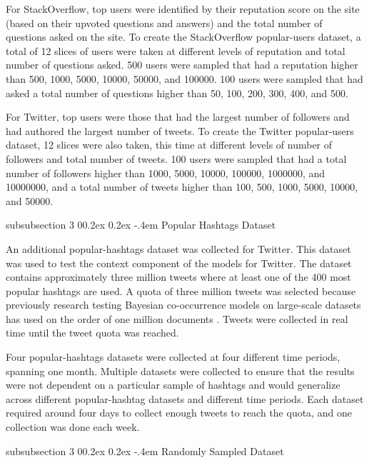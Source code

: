 \documentclass[man,floatsintext,donotrepeattitle]{apa6}
\makeatletter
\renewcommand{\subsubsection}{%
  \@startsection
  {subsubsection}%
  {3}%
  {\parindent}%
  {0\baselineskip \@plus 0.2ex \@minus 0.2ex}%
  {-.4em}%
  {\normalfont\normalsize\bfseries\addperi}}
\makeatother
\begin{document}
For StackOverflow, top users were identified by their reputation score on the site (based on their upvoted questions and answers) and the total number of questions asked on the site.
To create the StackOverflow popular-users dataset, a total of 12 slices of users were taken at different levels of reputation and total number of questions asked.
500 users were sampled that had a reputation higher than \num{500}, \num{1000}, \num{5000}, \num{10000}, \num{50000}, and \num{100000}.
100 users were sampled that had asked a total number of questions higher than \num{50}, \num{100}, \num{200}, \num{300}, \num{400}, and \num{500}.

For Twitter, top users were those that had the largest number of followers and had authored the largest number of tweets.
To create the Twitter popular-users dataset, 12 slices were also taken, this time at different levels of number of followers and total number of tweets.
100 users were sampled that had a total number of followers higher than \num{1000}, \num{5000}, \num{10000}, \num{100000}, \num{1000000}, and \num{10000000},
and a total number of tweets higher than \num{100}, \num{500}, \num{1000}, \num{5000}, \num{10000}, and \num{50000}.

\subsubsection{Popular Hashtags Dataset}

An additional popular-hashtags dataset was collected for Twitter.
This dataset was used to test the context component of the models for Twitter.
The dataset contains approximately three million tweets where at least one of the 400 most popular hashtags are used.
A quota of three million tweets was selected because previously research testing Bayesian co-occurrence models on large-scale datasets has used on the order of one million documents
\parencites{Stanley2013,Douglass2010,Budiu2007}.
Tweets were collected in real time until the tweet quota was reached.

Four popular-hashtags datasets were collected at four different time periods, spanning one month.
Multiple datasets were collected to ensure that the results were not dependent on a particular sample of hashtags and would generalize across different popular-hashtag datasets and different time periods.
Each dataset required around four days to collect enough tweets to reach the quota, and one collection was done each week.

\subsubsection{Randomly Sampled Dataset}
\end{document}
